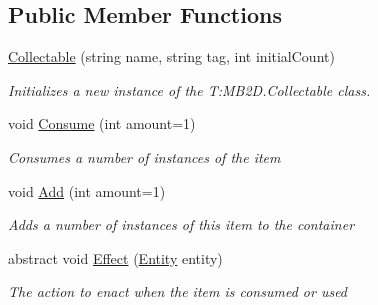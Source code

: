 \subsection*{Public Member Functions}
\begin{DoxyCompactItemize}
\item 
\hyperlink{class_m_b2_d_1_1_collectable_af635d4c8ce7035b0553f0d0bf6c8a25e}{Collectable} (string name, string tag, int initial\+Count)
\begin{DoxyCompactList}\small\item\em Initializes a new instance of the T\+:\+M\+B2\+D.\+Collectable class. \end{DoxyCompactList}\item 
void \hyperlink{class_m_b2_d_1_1_collectable_a089723a457d6a6d9249e44477f25ab9d}{Consume} (int amount=1)
\begin{DoxyCompactList}\small\item\em Consumes a number of instances of the item \end{DoxyCompactList}\item 
void \hyperlink{class_m_b2_d_1_1_collectable_a81e5756a4f1420a28674502724fc2191}{Add} (int amount=1)
\begin{DoxyCompactList}\small\item\em Adds a number of instances of this item to the container \end{DoxyCompactList}\item 
abstract void \hyperlink{class_m_b2_d_1_1_collectable_aeb2c8847eb3d5937b015f298703fd753}{Effect} (\hyperlink{class_m_b2_d_1_1_entity_component_1_1_entity}{Entity} entity)
\begin{DoxyCompactList}\small\item\em The action to enact when the item is consumed or used \end{DoxyCompactList}\end{DoxyCompactItemize}
